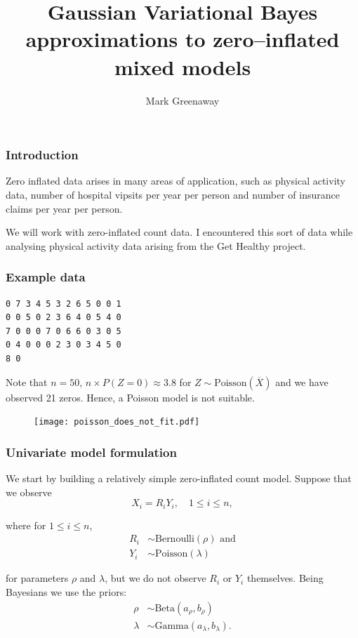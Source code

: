 \documentclass{beamer}
\title{Gaussian Variational Bayes approximations to zero--inflated mixed models}
\author{Mark Greenaway}
\begin{document}
\begin{frame}
	\titlepage
\end{frame}

\begin{frame}
	\frametitle{Introduction}
	Zero inflated data arises in many areas of application, such as physical
	activity data, number of hospital vipsits per year per person and
	number of insurance claims per year per person.
	
	\bigskip 
	We will work with zero-inflated count data. I encountered this sort of data 
	while analysing physical activity data arising from the Get Healthy project.
\end{frame}

\begin{frame}[fragile]
	\frametitle{Example data}
	\begin{verbatim}
0 7 3 4 5 3 2 6 5 0 0 1
0 0 5 0 2 3 6 4 0 5 4 0
7 0 0 0 7 0 6 6 0 3 0 5
0 4 0 0 0 2 3 0 3 4 5 0
8 0
	\end{verbatim}
	
	\noindent Note that $n=50$, 
	$n\times P(Z = 0) \approx 3.8$ for $Z\sim\mbox{Poisson}(\overline{X})$
	and we have observed 21 zeros. Hence,
	a Poisson model is not suitable.
	
	\begin{figure}
		\texttt{[image: poisson\_does\_not\_fit.pdf]}
	\end{figure}%
\end{frame}

\begin{frame}
	\frametitle{Univariate model formulation}
	
	We start by building a relatively simple zero-inflated count model. Suppose that we observe
	$$
	X_i = R_i Y_i, \quad 1\le i\le n,
	$$
	
	\noindent where for $1\le i\le n$,
	\begin{align*} 
		R_i & \sim \text{Bernoulli}(\rho) \text{ and} \\
		Y_i & \sim \text{Poisson}(\lambda)            
	\end{align*}
	
	\noindent for parameters $\rho$ and $\lambda$,
	but we do not observe $R_i$ or $Y_i$ themselves.
	Being Bayesians we use the priors:
	\begin{align*} 
		\rho    & \sim \text{Beta}(a_\rho, b_\rho)         \\
		\lambda & \sim \text{Gamma}(a_\lambda, b_\lambda). 
	\end{align*}
	
\end{frame}
\end{document}
